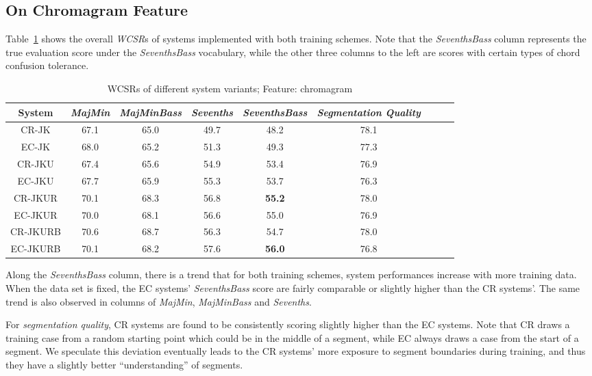 \subsection{On Chromagram Feature}\label{sec:4-ch}
\label{sec:4-over-ch}
Table~\ref{tab:4-overallres} shows the overall \textit{WCSR}s of systems implemented with both training schemes. Note that the \textit{SeventhsBass} column represents the true evaluation score under the \textit{SeventhsBass} vocabulary, while the other three columns to the left are scores with certain types of chord confusion tolerance.
\begin{table}[htb]
	\centering
	\scriptsize
	\begin{tabular}{|c|c|c|c|c|c|c|c|c|}\hline
		System & \textit{MajMin} & \textit{MajMinBass} & \textit{Sevenths} & \textbf{\textit{SeventhsBass}} & \textit{Segmentation Quality}  \\ \hline
		CR-JK & 67.1 & 65.0 & 49.7 & 48.2 & 78.1 \\ \hline
		EC-JK & 68.0 & 65.2 & 51.3 & 49.3 & 77.3 \\ \hline
		CR-JKU & 67.4 & 65.6 & 54.9 & 53.4 & 76.9 \\ \hline
		EC-JKU & 67.7 & 65.9 & 55.3 & 53.7 & 76.3 \\ \hline
		CR-JKUR & 70.1 & 68.3 & 56.8 & \textbf{55.2} & 78.0 \\ \hline
		EC-JKUR & 70.0 & 68.1 & 56.6 & 55.0 & 76.9 \\ \hline
		CR-JKURB & 70.6 & 68.7 & 56.3 & 54.7 & 78.0 \\ \hline
		EC-JKURB & 70.1 & 68.2 & 57.6 & \textbf{56.0} & 76.8 \\ \hline
	\end{tabular}
	\caption{WCSRs of different system variants; Feature: chromagram}
	\label{tab:4-overallres}
\end{table}

Along the \textit{SeventhsBass} column, there is a trend that for both training schemes, system performances increase with more training data. When the data set is fixed, the EC systems' \textit{SeventhsBass} score are fairly comparable or slightly higher than the CR systems'. The same trend is also observed in columns of \textit{MajMin}, \textit{MajMinBass} and \textit{Sevenths}.

For \textit{segmentation quality}, CR systems are found to be consistently scoring slightly higher than the EC systems. Note that CR draws a training case from a random starting point which could be in the middle of a segment, while EC always draws a case from the start of a segment. We speculate this deviation eventually leads to the CR systems' more exposure to segment boundaries during training, and thus they have a slightly better ``understanding'' of segments.

